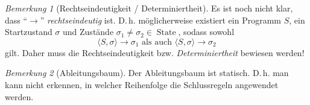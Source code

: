 \documentclass[a4paper,12pt]{article}
\theoremstyle{definition}
\theoremstyle{plain}
\theoremstyle{remark}
\newtheorem*{remark}{Bemerkung}
\DeclareMathOperator{\State}{State}
\begin{document}
\par\bigskip
\begin{remark}[Rechtseindeutigkeit / Determiniertheit]
    Es ist noch nicht klar, dass ``$\to$'' \emph{rechtseindeutig} ist. D.\,h. möglicherweise existiert ein Programm $S$, ein Startzustand $\sigma$ und Zustände $\sigma_1 \neq \sigma_2 \in \State$, sodass sowohl
    $$\langle S, \sigma \rangle \to \sigma_1 \text{ als auch } \langle S, \sigma \rangle \to \sigma_2$$
    gilt. Daher muss die Rechtseindeutigkeit bzw. \emph{Determiniertheit} bewiesen werden!
\end{remark}

\par\medskip
\begin{remark}[Ableitungsbaum]
    Der Ableitungsbaum ist statisch. D.\,h. man kann nicht erkennen, in welcher Reihenfolge die Schlussregeln angewendet werden.
\end{remark}
\end{document}

